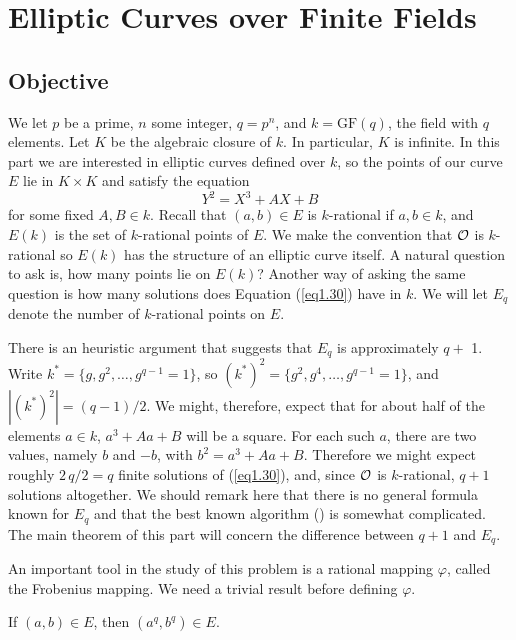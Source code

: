 \chapter{Elliptic Curves over Finite Fields}
\label{chapter2}
\section{Objective}

We let $p$ be a prime, $n$ some integer, $q=p^{n}$, and $k=\textrm{GF}(q)$, the field with $q$ elements. Let $K$ be the algebraic closure of $k$. In particular, $K$ is infinite. In this part we are interested in elliptic curves defined over $k$, so the points of our curve $E$ lie in $K \times K$ and satisfy the equation
\begin{equation}
\label{eq1.30}
Y^{2}=X^{3}+AX+B
\end{equation}
for some fixed $A,B\in k$. Recall that $(a,b)\in E$ is $k$-rational if $a,b\in k$, and $E(k)$ is the set of $k$-rational points of $E$. We make the convention that $\mathcal{O}$ is $k$-rational so $E(k)$ has the structure of an elliptic curve itself. A natural question to ask is, how many points lie on $E(k)$? Another way of asking the same question is how many solutions does Equation (\ref{eq1.30}) have in $k$. We will let $E_{q}$ denote the number of $k$-rational points on $E$.

There is an heuristic argument that suggests that $E_{q}$ is approximately $q+$ 1. Write $k^{*}=\{g,g^{2},\ldots, g^{q-1}=1\}$, so $(k^{*})^{2}=\{g^{2},g^{4}, \ldots, g^{q-1}=1\}$, and $|(k^{*})^{2}|=(q-1)/2$. We might, therefore, expect that for about half of the elements $a\in k$, $a^{3}+Aa+B$ will be a square. For each such $a$, there are two values, namely $b$ and $-b$, with $b^{2}=a^{3}+Aa+B$. Therefore we might expect roughly $2\, q/2=q$ finite solutions of (\ref{eq1.30}), and, since $\mathcal{O}$ is $k$-rational, $q+1$ solutions altogether. We should remark here that there is no general formula known for $E_{q}$ and that the best known algorithm (\cite{r1.5}) is somewhat complicated. The main theorem of this part will concern the difference between $q+1$ and $E_{q}$.

An important tool in the study of this problem is a rational mapping $\varphi$, called the Frobenius mapping. We need a trivial result before defining $\varphi$.

\begin{exo}
\label{e10.1}
If $(a,b)\in E$, then $(a^{q},b^{q})\in E$.
\end{exo}

